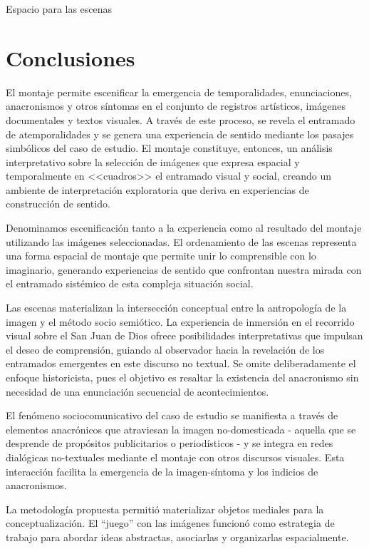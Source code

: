 \vspace{4cm}
        
Espacio para las escenas 



\clearpage
\section{Conclusiones}

El montaje permite escenificar la emergencia de temporalidades, enunciaciones, anacronismos y otros síntomas en el conjunto de registros artísticos, imágenes documentales y textos visuales. A través de este proceso, se revela el entramado de atemporalidades y se genera una experiencia de sentido mediante los pasajes simbólicos del caso de estudio. El montaje constituye, entonces, un análisis interpretativo sobre la selección de imágenes que expresa espacial y temporalmente en <<cuadros>> el entramado visual y social, creando un ambiente de interpretación exploratoria que deriva en experiencias de construcción de sentido.

Denominamos escenificación tanto a la experiencia como al resultado del montaje utilizando las imágenes seleccionadas. El ordenamiento de las escenas representa una forma espacial de montaje que permite unir lo comprensible con lo imaginario, generando experiencias de sentido que confrontan nuestra mirada con el entramado sistémico de esta compleja situación social.

Las escenas materializan la intersección conceptual entre la antropología de la imagen y el método socio semiótico. La experiencia de inmersión en el recorrido visual sobre el San Juan de Dios ofrece posibilidades interpretativas que impulsan el deseo de comprensión, guiando al observador hacia la revelación de los entramados emergentes en este discurso no textual. Se omite deliberadamente el enfoque historicista, pues el objetivo es resaltar la existencia del anacronismo sin necesidad de una enunciación secuencial de acontecimientos.

El fenómeno sociocomunicativo del caso de estudio se manifiesta a través de elementos anacrónicos que atraviesan la imagen no-domesticada - aquella que se desprende de propósitos publicitarios o periodísticos - y se integra en redes dialógicas no-textuales mediante el montaje con otros discursos visuales. Esta interacción facilita la emergencia de la imagen-síntoma y los indicios de anacronismos.

La metodología propuesta permitió materializar objetos mediales para la conceptualización. El ``juego'' con las imágenes funcionó como estrategia de trabajo para abordar ideas abstractas, asociarlas y organizarlas espacialmente.


